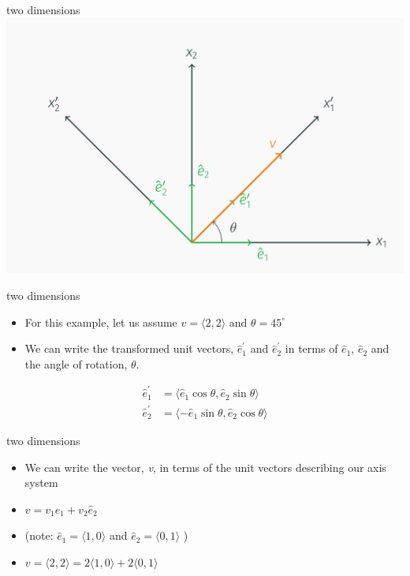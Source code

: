 \documentclass[
  letterpaper,
  ignorenonframetext,
  aspectratio=43,
  handout,
  12pt]{beamer}
\providecommand{\tightlist}{%
  \setlength{\itemsep}{0pt}\setlength{\parskip}{0pt}}
\providecommand{\tightlist}{%
\setlength{\itemsep}{0pt}\setlength{\parskip}{0pt}}
\let\Oldincludegraphics\includegraphics
\renewcommand{\includegraphics}[2][]{\Oldincludegraphics[width=\textwidth,height=0.7\textheight,keepaspectratio]{#2}}
\begin{document}
\begin{frame}{two dimensions}
\protect\hypertarget{two-dimensions-1}{}
\includegraphics{../images/transform2D-unit.png}
\end{frame}

\begin{frame}{two dimensions}
\protect\hypertarget{two-dimensions-2}{}
\begin{itemize}
\tightlist
\item
  For this example, let us assume \(v = \langle 2, 2 \rangle\) and
  \(\theta = 45^\circ\)
\item
  We can write the transformed unit vectors, \(\hat{e}_1^\prime\) and
  \(\hat{e}_2^\prime\) in terms of \(\hat{e}_1\), \(\hat{e}_2\) and the
  angle of rotation, \(\theta\).
\end{itemize}

\[\begin{aligned}
\hat{e}_1^\prime &= \langle \hat{e}_1 \cos \theta , \hat{e}_2 \sin \theta\rangle\\
\hat{e}_2^\prime &= \langle -\hat{e}_1 \sin \theta , \hat{e}_2 \cos \theta \rangle\end{aligned}\]
\end{frame}

\begin{frame}{two dimensions}
\protect\hypertarget{two-dimensions-3}{}
\begin{itemize}
\tightlist
\item
  We can write the vector, \emph{v}, in terms of the unit vectors
  describing our axis system
\item
  \(v = v_1 \hat{e}_1 + v_2 \hat{e}_2\)
\item
  (note: \(\hat{e}_1=\langle 1, 0 \rangle\) and
  \(\hat{e}_2 = \langle 0,1 \rangle\) )
\item
  \(v = \langle 2, 2 \rangle = 2\langle 1, 0\rangle + 2\langle 0, 1 \rangle\)
\end{itemize}
\end{frame}
\end{document}
